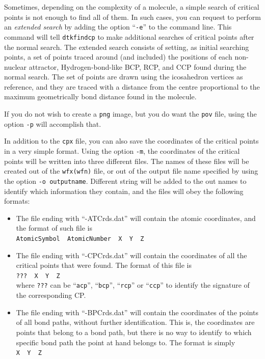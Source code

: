 Sometimes, depending on the complexity of a molecule, a simple search of critical points is not enough to find all of them. In such cases, you can request to perform an \textit{extended search}
by adding the option ``\texttt{-e}'' to the command line. This command will tell \texttt{dtkfindcp}
to make additional searches of critical points after the normal search.
 The extended search consists of setting, as initial searching points,
a set of points traced around (and included) the positions of each non-nuclear
attractor, Hydrogen-bond-like BCP, RCP, and CCP found during the normal search. The set of points
are drawn using the icosahedron vertices as reference, and they are traced with a distance from
the centre proportional to the maximum geometrically bond distance found in the molecule.

If you do not wish to create a \texttt{png} image, but you do want the \texttt{pov} file, using the option \texttt{-p} will accomplish that.

In addition to the \texttt{cpx} file, you can also save the coordinates of the critical points in a very simple format. Using the option \texttt{-m}, the coordinates of the critical points will be written into three different files. The names of these files will be created out of the \texttt{wfx(wfn)} file, or out of the output file name specified by using the option \texttt{-o outputname}. Different string will be added to the out names to identify which information they contain, and the files will obey the following formats:
\begin{itemize}
   \item The file ending with ``-ATCrds.dat'' will contain the atomic coordinates, and the format of such file is\\
   \texttt{AtomicSymbol \ AtomicNumber \ X \ Y \ Z}
   \item The file ending with ``-CPCrds.dat'' will contain the coordinates of all the critical points that were found. The format of this file is\\
   \texttt{??? \ X \ Y \ Z}\\
   where \texttt{???} can be ``\texttt{acp}'', ``\texttt{bcp}'', ``\texttt{rcp}'' or ``\texttt{ccp}'' to identify the signature of the corresponding CP.
   \item The file ending with ``-BPCrds.dat'' will contain the coordinates of the points of all bond paths, without further identification. This is, the coordinates are points that belong to a bond path, but there is no way to identify to which specific bond path the point at hand belongs to. The format is simply\\
   \texttt{X \ Y \ Z}
\end{itemize}

